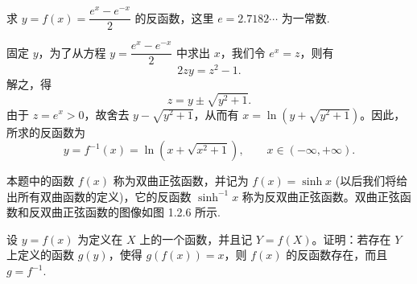 \begin{example}\label{example:ma-1-2-7}
求 $y=f(x)=\dfrac{e^x-e^{-x}}{2}$ 的反函数，这里 $e=2.7182\cdots$ 为一常数.
\end{example}


\begin{solve}
固定 $y$，为了从方程 $y=\dfrac{e^x-e^{-x}}{2}$ 中求出 $x$，我们令 $e^x=z$，则有
\[
  2zy=z^2-1.
\]
解之，得
\[
  z=y\pm\sqrt{y^2+1}.
\]
由于 $z=e^x>0$，故舍去 $y-\sqrt{y^2+1}$，从而有 $x=\ln(y+\sqrt{y^2+1})$。因此，所求的反函数为
\[
  y=f^{-1}(x)=\ln(x+\sqrt{x^2+1}),\qquad x\in(-\infty,+\infty).
\]

本题中的函数 $f(x)$ 称为双曲正弦函数，并记为 $f(x)=\sinh x$ (以后我们将给出所有双曲函数的定义)，它的反函数 $\sinh^{-1}x$ 称为反双曲正弦函数。双曲正弦函数和反双曲正弦函数的图像如图 1.2.6 所示.
\end{solve}


\begin{example}\label{example:ma-1-2-8}
设 $y=f(x)$ 为定义在 $X$ 上的一个函数，并且记 $Y=f(X)$。证明：若存在 $Y$ 上定义的函数 $g(y)$，使得 $g(f(x))=x$，则 $f(x)$ 的反函数存在，而且 $g=f^{-1}$.
\end{example}


